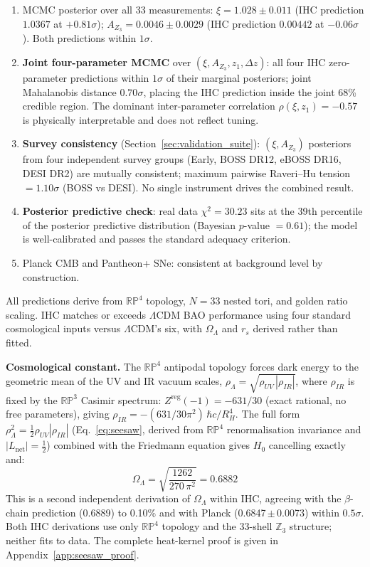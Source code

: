 \documentclass[12pt,a4paper]{article}
\begin{document}
\begin{enumerate}
  \item MCMC posterior over all 33 measurements: $\xi = 1.028 \pm 0.011$ (IHC
        prediction $1.0367$ at $+0.81\sigma$); $A_{Z_3} = 0.0046 \pm 0.0029$
        (IHC prediction $0.00442$ at $-0.06\sigma$). Both predictions within $1\sigma$.
  \item \textbf{Joint four-parameter MCMC} over $(\xi, A_{Z_3}, z_1, \Delta z)$:
        all four IHC zero-parameter predictions within $1\sigma$ of their marginal
        posteriors; joint Mahalanobis distance $0.70\sigma$, placing the IHC prediction
        inside the joint 68\% credible region.  The dominant inter-parameter
        correlation $\rho(\xi, z_1) = -0.57$ is physically interpretable and
        does not reflect tuning.
  \item \textbf{Survey consistency} (Section~\ref{sec:validation_suite}):
        $(\xi, A_{Z_3})$ posteriors from four independent survey groups (Early,
        BOSS DR12, eBOSS DR16, DESI DR2) are mutually consistent;
        maximum pairwise Raveri--Hu tension $= 1.10\sigma$ (BOSS vs DESI).
        No single instrument drives the combined result.
  \item \textbf{Posterior predictive check}: real data $\chi^2 = 30.23$
        sits at the 39th percentile of the posterior predictive distribution
        (Bayesian $p$-value $= 0.61$); the model is well-calibrated and
        passes the standard adequacy criterion.
  \item Planck CMB and Pantheon+ SNe: consistent at background level by construction.
\end{enumerate}

All predictions derive from $\mathbb{RP}^4$ topology, $N = 33$ nested tori, and
golden ratio scaling. IHC matches or exceeds $\Lambda$CDM BAO performance using four
standard cosmological inputs versus $\Lambda$CDM's six, with $\Omega_\Lambda$ and
$r_s$ derived rather than fitted.

\textbf{Cosmological constant.} The $\mathbb{RP}^4$ antipodal topology forces dark energy
to the geometric mean of the UV and IR vacuum scales,
$\rho_\Lambda = \sqrt{\rho_{UV}\,|\rho_{IR}|}$,
where $\rho_{IR}$ is fixed by the $\mathbb{RP}^3$ Casimir spectrum:
$Z^\mathrm{reg}(-1) = -631/30$ (exact rational, no free parameters),
giving $\rho_{IR} = -(631/30\pi^2)\,\hbar c/R_H^4$.
The full form $\rho_\Lambda^2 = \tfrac{1}{2}\rho_{UV}|\rho_{IR}|$
(Eq.~\ref{eq:seesaw}, derived from $\mathbb{RP}^4$ renormalisation invariance
and $|L_\mathrm{net}|=\tfrac{1}{2}$) combined with the Friedmann equation gives
$H_0$ cancelling exactly and:
\begin{equation}
  \Omega_\Lambda = \sqrt{\frac{1262}{270\,\pi^2}} = 0.6882
\end{equation}
This is a second independent derivation of $\Omega_\Lambda$ within IHC,
agreeing with the $\beta$-chain prediction (0.6889) to 0.10\% and with Planck
(0.6847\,$\pm$\,0.0073) within $0.5\sigma$.  Both IHC derivations use only
$\mathbb{RP}^4$ topology and the 33-shell $\mathbb{Z}_3$ structure; neither fits to data.
The complete heat-kernel proof is given in Appendix~\ref{app:seesaw_proof}.
\end{document}

